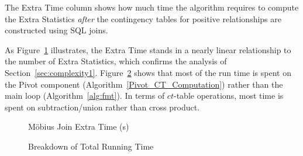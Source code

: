 \documentclass{sfuthesis}
\newcommand{\ct}{\mathit{ct}}
\begin{document}
The Extra Time column shows how much time the \MJ algorithm requires to compute the Extra Statistics {\em after} the contingency tables for positive relationships are constructed using SQL joins.


 As Figure~\ref{fig:runtime-vj} illustrates, the Extra Time stands in a nearly linear relationship to the number of Extra Statistics, which confirms the analysis of Section~\ref{sec:complexity1}. Figure~\ref{fig:breakdown-vj} shows that most of the \MJ run time is spent on the Pivot component (Algorithm~\ref{Pivot_CT_Computation}) rather than the main loop (Algorithm~\ref{alg:fmt}). In terms of $\ct$-table operations, most time is spent on subtraction/union rather than cross product.
\begin{figure}[!h]
\begin{center}

\caption{M\"obius Join Extra Time (s)
\label{fig:runtime-vj}}
\end{center}
\end{figure}



\begin{figure}[!h]
\begin{center}
\caption{Breakdown of \MJ Total Running Time
\label{fig:breakdown-vj}}
\end{center}
\end{figure}
\end{document}
